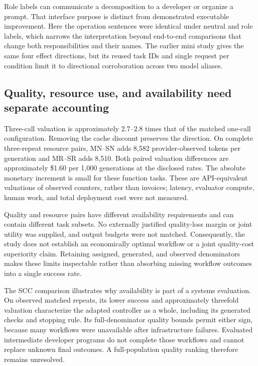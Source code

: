Role labels can communicate a decomposition to a developer or organize a prompt. That interface purpose is distinct from demonstrated executable improvement. Here the operation sentences were identical under neutral and role labels, which narrows the interpretation beyond end-to-end comparisons that change both responsibilities and their names. The earlier mini study gives the same four effect directions, but its reused task IDs and single request per condition limit it to directional corroboration across two model aliases.

\subsection{Quality, resource use, and availability need separate accounting}
Three-call valuation is approximately 2.7--2.8 times that of the matched one-call configuration. Removing the cache discount preserves the direction. On complete three-repeat resource pairs, MN--SN adds 8,582 provider-observed tokens per generation and MR--SR adds 8,510. Both paired valuation differences are approximately \$1.60 per 1,000 generations at the disclosed rates. The absolute monetary increment is small for these function tasks. These are API-equivalent valuations of observed counters, rather than invoices; latency, evaluator compute, human work, and total deployment cost were not measured.

Quality and resource pairs have different availability requirements and can contain different task subsets. No externally justified quality-loss margin or joint utility was supplied, and output budgets were not matched. Consequently, the study does not establish an economically optimal workflow or a joint quality-cost superiority claim. Retaining assigned, generated, and observed denominators makes these limits inspectable rather than absorbing missing workflow outcomes into a single success rate.

The SCC comparison illustrates why availability is part of a systems evaluation. On observed matched repeats, its lower success and approximately threefold valuation characterize the adapted controller as a whole, including its generated checks and stopping rule. Its full-denominator quality bounds permit either sign, because many workflows were unavailable after infrastructure failures. Evaluated intermediate developer programs do not complete those workflows and cannot replace unknown final outcomes. A full-population quality ranking therefore remains unresolved.

